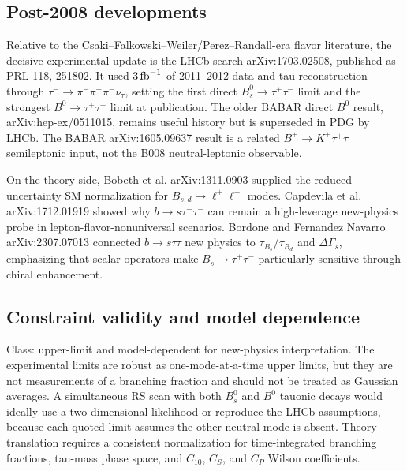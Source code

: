 \subsection*{Post-2008 developments}
Relative to the Csaki--Falkowski--Weiler/Perez--Randall-era flavor literature,
the decisive experimental update is the LHCb search
arXiv:1703.02508, published as PRL 118, 251802.  It used \(3\,{\rm fb}^{-1}\)
of 2011--2012 data and tau reconstruction through
\(\tau^-\to\pi^-\pi^+\pi^-\nu_\tau\), setting the first direct
\(B_s^0\to\tau^+\tau^-\) limit and the strongest \(B^0\to\tau^+\tau^-\)
limit at publication.  The older BABAR direct \(B^0\) result,
arXiv:hep-ex/0511015, remains useful history but is superseded in PDG by LHCb.
The BABAR arXiv:1605.09637 result is a related \(B^+\to K^+\tau^+\tau^-\)
semileptonic input, not the B008 neutral-leptonic observable.

On the theory side, Bobeth et al. arXiv:1311.0903 supplied the
reduced-uncertainty SM normalization for \(B_{s,d}\to\ell^+\ell^-\) modes.
Capdevila et al. arXiv:1712.01919 showed why \(b\to s\tau^+\tau^-\) can remain
a high-leverage new-physics probe in lepton-flavor-nonuniversal scenarios.
Bordone and Fernandez Navarro arXiv:2307.07013 connected \(b\to s\tau\tau\)
new physics to \(\tau_{B_s}/\tau_{B_d}\) and \(\Delta\Gamma_s\), emphasizing
that scalar operators make \(B_s\to\tau^+\tau^-\) particularly sensitive
through chiral enhancement.

\subsection*{Constraint validity and model dependence}
Class: upper-limit and model-dependent for new-physics interpretation.  The
experimental limits are robust as one-mode-at-a-time upper limits, but they are
not measurements of a branching fraction and should not be treated as Gaussian
averages.  A simultaneous RS scan with both \(B_s^0\) and \(B^0\) tauonic
decays would ideally use a two-dimensional likelihood or reproduce the LHCb
assumptions, because each quoted limit assumes the other neutral mode is absent.
Theory translation requires a consistent normalization for time-integrated
branching fractions, tau-mass phase space, and \(C_{10}\), \(C_S\), and
\(C_P\) Wilson coefficients.

